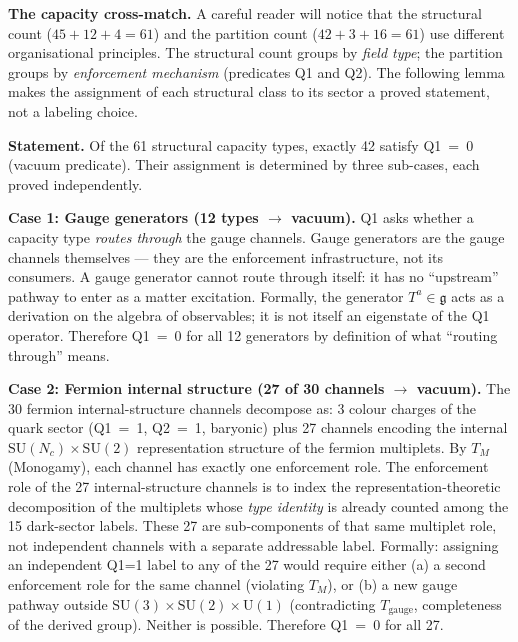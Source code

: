 \documentclass[11pt]{article}
\newcommand{\SU}{\mathrm{SU}}
\newcommand{\U}{\mathrm{U}}
\begin{document}
\smallskip
\noindent\textbf{The capacity cross-match.}\quad
A careful reader will notice that the structural count ($45 + 12 + 4 = 61$) and the partition count ($42 + 3 + 16 = 61$) use different organisational principles.  The structural count groups by \emph{field type}; the partition groups by \emph{enforcement mechanism} (predicates Q1 and Q2).  The following lemma makes the assignment of each structural class to its sector a proved statement, not a labeling choice.

\begin{tcolorbox}[apfbox, title={Lemma $L_{\mathrm{vac}}$ (Vacuum Sector Assignment)}]
\textbf{Statement.}  Of the 61 structural capacity types, exactly 42 satisfy Q1~=~0 (vacuum predicate).  Their assignment is determined by three sub-cases, each proved independently.

\medskip\noindent\textbf{Case 1: Gauge generators (12 types $\to$ vacuum).}
Q1 asks whether a capacity type \emph{routes through} the gauge channels.  Gauge generators are the gauge channels themselves --- they are the enforcement infrastructure, not its consumers.  A gauge generator cannot route through itself: it has no ``upstream'' pathway to enter as a matter excitation.  Formally, the generator $T^a \in \mathfrak{g}$ acts as a derivation on the algebra of observables; it is not itself an eigenstate of the Q1 operator.  Therefore Q1~=~0 for all 12 generators by definition of what ``routing through'' means.

\medskip\noindent\textbf{Case 2: Fermion internal structure (27 of 30 channels $\to$ vacuum).}
The 30 fermion internal-structure channels decompose as: 3 colour charges of the quark sector (Q1~=~1, Q2~=~1, baryonic) plus 27 channels encoding the internal $\mathrm{SU}(N_c) \times \mathrm{SU}(2)$ representation structure of the fermion multiplets.  By $T_M$ (Monogamy), each channel has exactly one enforcement role.  The enforcement role of the 27 internal-structure channels is to index the representation-theoretic decomposition of the multiplets whose \emph{type identity} is already counted among the 15 dark-sector labels.  These 27 are sub-components of that same multiplet role, not independent channels with a separate addressable label.  Formally: assigning an independent Q1=1 label to any of the 27 would require either (a) a second enforcement role for the same channel (violating $T_M$), or (b) a new gauge pathway outside $\SU(3) \times \SU(2) \times \U(1)$ (contradicting $T_{\mathrm{gauge}}$, completeness of the derived group).  Neither is possible.  Therefore Q1~=~0 for all 27.


\end{tcolorbox}
\end{document}
